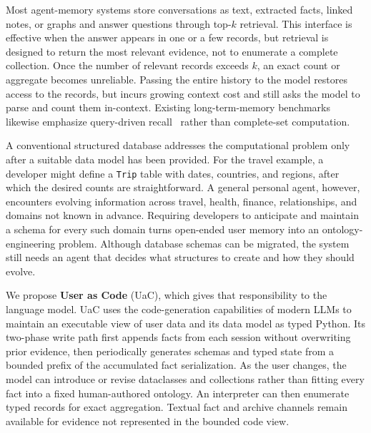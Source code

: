 \documentclass[letterpaper]{article} %
\begin{document}
Most agent-memory systems store conversations as text, extracted facts, linked notes, or graphs and answer questions through top-$k$ retrieval. This interface is effective when the answer appears in one or a few records, but retrieval is designed to return the most relevant evidence, not to enumerate a complete collection. Once the number of relevant records exceeds $k$, an exact count or aggregate becomes unreliable. Passing the entire history to the model restores access to the records, but incurs growing context cost and still asks the model to parse and count them in-context. Existing long-term-memory benchmarks likewise emphasize query-driven recall~\citep{maharana2024locomo,wu2025longmemeval,hu2025memoryagentbench} rather than complete-set computation.

A conventional structured database addresses the computational problem only after a suitable data model has been provided. For the travel example, a developer might define a \texttt{Trip} table with dates, countries, and regions, after which the desired counts are straightforward. A general personal agent, however, encounters evolving information across travel, health, finance, relationships, and domains not known in advance. Requiring developers to anticipate and maintain a schema for every such domain turns open-ended user memory into an ontology-engineering problem. Although database schemas can be migrated, the system still needs an agent that decides what structures to create and how they should evolve.

We propose \textbf{User as Code} (UaC), which gives that responsibility to the language model. UaC uses the code-generation capabilities of modern LLMs to maintain an executable view of user data and its data model as typed Python. Its two-phase write path first appends facts from each session without overwriting prior evidence, then periodically generates schemas and typed state from a bounded prefix of the accumulated fact serialization. As the user changes, the model can introduce or revise dataclasses and collections rather than fitting every fact into a fixed human-authored ontology. An interpreter can then enumerate typed records for exact aggregation. Textual fact and archive channels remain available for evidence not represented in the bounded code view.
\end{document}
